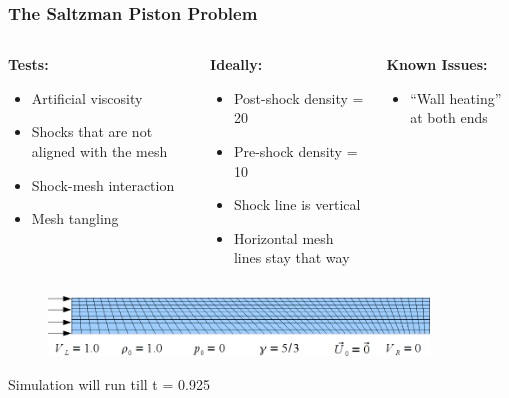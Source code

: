 \documentclass[8pt,xcolor=svgnames]{beamer}
\begin{document}
\begin{frame}
 \frametitle{The Saltzman Piston Problem}
\begin{columns}[t]
 \begin{column}{0.3\textwidth}
\textbf{Tests:}
  \begin{itemize}
   \item Artificial viscosity
   \item Shocks that are not aligned with the mesh
   \item Shock-mesh interaction
   \item Mesh tangling
  \end{itemize}
 \end{column}
 \begin{column}{0.3\textwidth}
\textbf{Ideally:}
  \begin{itemize}
   \item Post-shock density = 20
   \item Pre-shock density = 10
   \item Shock line is vertical
   \item Horizontal mesh lines stay that way
  \end{itemize}
 \end{column}
 \begin{column}{0.3\textwidth}
\textbf{Known Issues:}
  \begin{itemize}
   \item ``Wall heating'' at both ends
  \end{itemize}
 \end{column}
\end{columns}
    \begin{figure}[h!]
    \centering
    \includegraphics[width=0.9\textwidth,keepaspectratio=true]{./Images/SaltzmanPiston.png}
    \end{figure}
\begin{center}
Simulation will run till t = 0.925
\end{center}
\end{frame}
\end{document}
